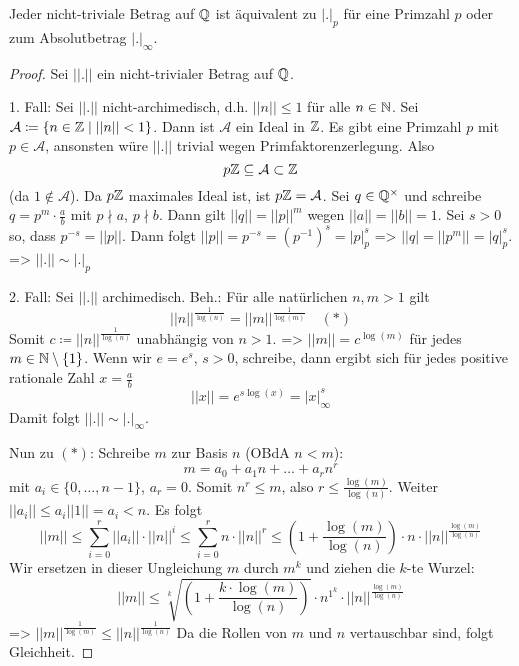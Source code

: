\documentclass[../main.tex]{subfiles}
\begin{document}
\begin{theorem}
    Jeder nicht-triviale Betrag auf $\mathbb{Q}$ ist äquivalent zu $|.|_p$ für eine Primzahl $p$ oder zum Absolutbetrag $|.|_\infty$.
\end{theorem}
\begin{proof}
    Sei $||.||$ ein nicht-trivialer Betrag auf $\mathbb{Q}$.

    1. Fall: Sei $||.||$ nicht-archimedisch, d.h. $||n||\leq 1$ für alle $n\in \mathbb{N}$.
    Sei $\mathcal{A}\coloneqq \{n\in \mathbb{Z}\mid ||n|| <1\}$.
    Dann ist $\mathcal{A}$ ein Ideal in $\mathbb{Z}$.
    Es gibt eine Primzahl $p$ mit $p\in \mathcal{A}$, ansonsten würe $||.||$ trivial wegen Primfaktorenzerlegung. Also
    $$p\mathbb{Z}\subseteq\mathcal{A}\subset \mathbb{Z}$$ (da $1\notin \mathcal{A}$).
    Da $p\mathbb{Z}$ maximales Ideal ist, ist $p\mathbb{Z} = \mathcal{A}$.
    Sei $q\in \mathbb{Q}^\times$ und schreibe $q=p^m\cdot \frac{a}{b}$ mit $p\nmid a$, $p\nmid b$.
    Dann gilt $||q|| = ||p||^m$ wegen $||a|| = ||b|| =1$.
    Sei $s>0$ so, dass $p^{-s} = ||p||$.
    Dann folgt $||p|| =p^{-s} = (p^{-1})^s= |p|_p^s$ => $||q| = ||p^m|| = |q|_p^s$.
    => $||.|| \sim |.|_p$
    

    2. Fall: Sei $||.||$ archimedisch.
    Beh.: Für alle natürlichen $n,m>1$ gilt
    $$||n||^{\frac{1}{\log(n)}} = ||m||^{\frac{1}{\log(m)}}\quad (*)$$
    Somit $c\coloneqq||n||^{\frac{1}{\log(n)}}$ unabhängig von $n>1$.
    => $||m|| = c^{\log(m)}$ für jedes $m\in \mathbb{N}\setminus\{1\}$.
    Wenn wir $e = e^s$, $s>0$, schreibe, dann ergibt sich für jedes positive rationale Zahl $x=\frac{a}{b}$
    $$||x|| = e^{s\log(x)} = |x|_\infty^s$$
    Damit folgt $||.||\sim |.|_\infty$.

    Nun zu $(*)$:
    Schreibe $m$ zur Basis $n$ (OBdA $n<m$):
    $$m= a_0 + a_1 n+\dots+a_rn^r$$
    mit $a_i\in \{0,\dots,n-1\}$, $a_r = 0$.
    Somit $n^r\leq m$, also $r\leq \frac{\log(m)}{\log(n)}$.
    Weiter $||a_i|| \leq a_i ||1|| = a_i<n$.
    Es folgt $$||m||\leq \sum_{i=0}^r ||a_i|| \cdot ||n||^i\leq \sum_{i=0}^r n \cdot ||n||^r \leq \left(1+\frac{\log(m)}{\log(n)}\right) \cdot n \cdot ||n||^{\frac{\log(m)}{\log(n)}}$$
    Wir ersetzen in dieser Ungleichung $m$ durch $m^k$ und ziehen die $k$-te Wurzel:
    $$||m|| \leq \sqrt[k]{\left(1+\frac{k\cdot\log(m)}{\log(n)}\right)}\cdot n^{1^k} \cdot ||n||^{\frac{\log(m)}{\log(n)}}$$
    => $||m||^{\frac{1}{\log(m)}} \leq ||n||^{\frac{1}{\log(n)}}$
    Da die Rollen von $m$ und $n$ vertauschbar sind, folgt Gleichheit.
\end{proof}
\end{document}
